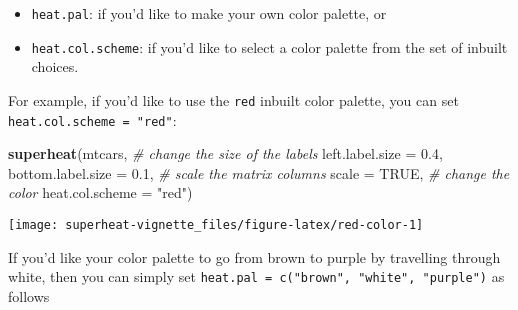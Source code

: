 \documentclass[]{book}
\newenvironment{Shaded}{\begin{snugshade}}{\end{snugshade}}
\newcommand{\KeywordTok}[1]{\textcolor[rgb]{0.13,0.29,0.53}{\textbf{{#1}}}}
\newcommand{\DataTypeTok}[1]{\textcolor[rgb]{0.13,0.29,0.53}{{#1}}}
\newcommand{\FloatTok}[1]{\textcolor[rgb]{0.00,0.00,0.81}{{#1}}}
\newcommand{\StringTok}[1]{\textcolor[rgb]{0.31,0.60,0.02}{{#1}}}
\newcommand{\CommentTok}[1]{\textcolor[rgb]{0.56,0.35,0.01}{\textit{{#1}}}}
\newcommand{\OtherTok}[1]{\textcolor[rgb]{0.56,0.35,0.01}{{#1}}}
\newcommand{\NormalTok}[1]{{#1}}
\theoremstyle{definition}
\theoremstyle{definition}
\theoremstyle{remark}
\begin{document}
\begin{itemize}
\item
  \texttt{heat.pal}: if you'd like to make your own color palette, or
\item
  \texttt{heat.col.scheme}: if you'd like to select a color palette from
  the set of inbuilt choices.
\end{itemize}

For example, if you'd like to use the \texttt{red} inbuilt color
palette, you can set \texttt{heat.col.scheme\ =\ "red"}:

\begin{Shaded}
\begin{Highlighting}[]
\KeywordTok{superheat}\NormalTok{(mtcars,}
          \CommentTok{# change the size of the labels}
          \DataTypeTok{left.label.size =} \FloatTok{0.4}\NormalTok{,}
          \DataTypeTok{bottom.label.size =} \FloatTok{0.1}\NormalTok{,}
          \CommentTok{# scale the matrix columns}
          \DataTypeTok{scale =} \OtherTok{TRUE}\NormalTok{,}
          \CommentTok{# change the color}
          \DataTypeTok{heat.col.scheme =} \StringTok{"red"}\NormalTok{)}
\end{Highlighting}
\end{Shaded}

\begin{center}\texttt{[image: superheat-vignette\_files/figure-latex/red-color-1]} \end{center}

If you'd like your color palette to go from brown to purple by
travelling through white, then you can simply set
\texttt{heat.pal\ =\ c("brown",\ "white",\ "purple")} as follows

\begin{Shaded}
\end{Shaded}
\end{document}
